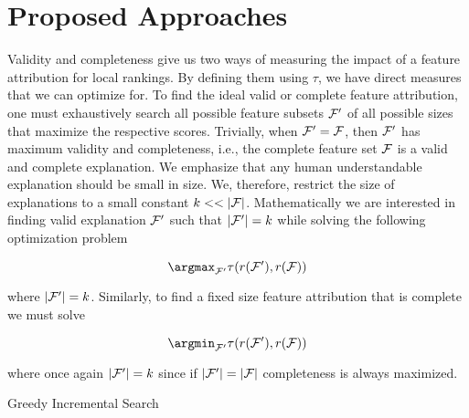 \chapter{Proposed Approaches}\label{ch:Approach}
Validity and completeness give us two ways of measuring the impact of a feature attribution for local rankings. By defining them using $\tau$, we have direct measures that we can optimize for. To find the ideal valid or complete feature attribution, one must exhaustively search all possible feature subsets $\mathcal{F}'$ of all possible sizes that maximize the respective scores. Trivially, when $\mathcal{F}' = \mathcal{F}$, then $\mathcal{F}'$ has maximum validity and completeness, i.e., the complete feature set $\mathcal{F}$ is a valid and complete explanation. We emphasize that any human understandable explanation should be small in size. We, therefore, restrict the size of explanations to a small constant $k<< |\mathcal{F}|$. Mathematically we are interested in finding valid explanation $\mathcal{F}'$ such that $|\mathcal{F}'|=k$ while solving the following optimization problem


\begin{equation}\label{eq:validity}
    \argmax_{\f'} \tau(r(\f'), r(\f))
\end{equation}



where $|\mathcal{F}'| = k$. Similarly, to find a fixed size feature attribution that is complete we must solve

\begin{equation}\label{eq:completeness}
    \argmin_{\f'} \tau(r(\f'), r(\f))
\end{equation}

where once again $|\mathcal{F}'| = k$ since if $|\mathcal{F}'| = |\mathcal{F}|$ completeness is always maximized.
 \begin{algorithm}[ht!]
\begin{algorithmic}[1]

\caption{Greedy Incremental Search}
\label{alg:incSearch}
                \EndFor
           
		 \EndFunction
\end{algorithmic}
\end{algorithm}

